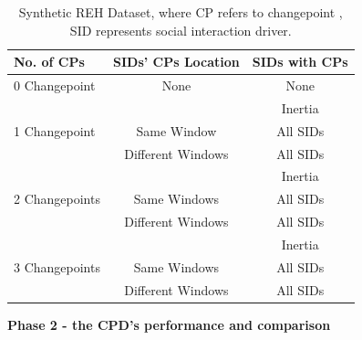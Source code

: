 \documentclass[]{interact}
\theoremstyle{plain}%
\theoremstyle{definition}
\theoremstyle{remark}
\begin{document}
\begin{table}[h]
	\centering
	\small
    \begin{tabular}{|l|c|c|}
		\hline
		\textbf{No. of CPs} & \multicolumn{1}{l|}{\textbf{SIDs' CPs Location}} & \multicolumn{1}{l|}{\textbf{SIDs with CPs}} \\ \hline
		0 Changepoint                & None                                                           & None                                        \\ \hline
		&                                                                & Inertia                                     \\ \cline{2-3} 
		1 Changepoint                & Same Window                                                    & All SIDs                                    \\ \cline{2-3} 
		& Different Windows                                              & All SIDs                                    \\ \hline
		&                                                                & Inertia                                     \\ \cline{2-3} 
		2 Changepoints               & Same Windows                                                   & All SIDs                                    \\ \cline{2-3} 
		& Different Windows                                              & All SIDs                                    \\ \hline
		&                                                                & Inertia                                     \\ \cline{2-3} 
		3 Changepoints               & Same Windows                                                   & All SIDs                                    \\ \cline{2-3} 
		& Different Windows                                              & All SIDs                                    \\ \hline
    \end{tabular}
    \caption{Synthetic REH Dataset, where CP refers to changepoint , SID represents social interaction driver.}
    \label{Table 2}
\end{table}

\hspace{-0.55cm} \textbf{Phase 2 - the CPD's performance and comparison}\\
\end{document}
